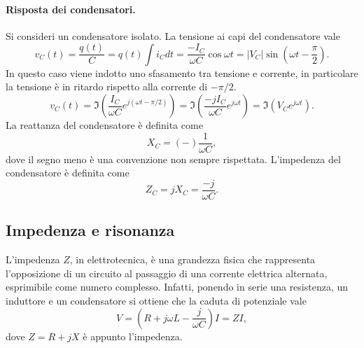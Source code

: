 \paragraph{Risposta dei condensatori.} Si consideri un condensatore isolato. La tensione ai capi del condensatore vale
\begin{equation}
    v_C(t)=\frac{q(t)}{C}=q(t)\int i_Cdt=\frac{-I_C}{\omega C}\cos{\omega t}=|V_C|\sin{\left(\omega t-\frac{\pi}{2}\right)}.
\end{equation}
In questo caso viene indotto uno sfasamento tra tensione e corrente, in particolare la tensione è in ritardo rispetto alla corrente di $-\pi/2$.
\begin{equation}
    v_C(t)=\Im\left(\frac{I_C}{\omega C}e^{j\left(\omega t-\pi/2\right)}\right)=\Im\left(\frac{-jI_C}{\omega C}e^{j\omega t}\right)=\Im\left(V_Ce^{j\omega t}\right).
\end{equation}
La reattanza del condensatore è definita come
\begin{equation}
    X_C=(-)\frac{1}{\omega C},
\end{equation}
dove il segno meno è una convenzione non sempre rispettata. L'impedenza del condensatore è definita come
\begin{equation}
    Z_C=jX_C=\frac{-j}{\omega C}.
\end{equation}

\subsection{Impedenza e risonanza}
L'impedenza $Z$, in elettrotecnica, è una grandezza fisica che rappresenta l'opposizione di un circuito al passaggio di una corrente elettrica alternata, esprimibile come numero complesso. Infatti, ponendo in serie una resistenza, un induttore e un condensatore si ottiene che la caduta di potenziale vale
\begin{equation}
    V=\left(R+j\omega L-\frac{j}{\omega C}\right)I=ZI,
\end{equation}
dove $Z=R+jX$ è appunto l'impedenza. 

